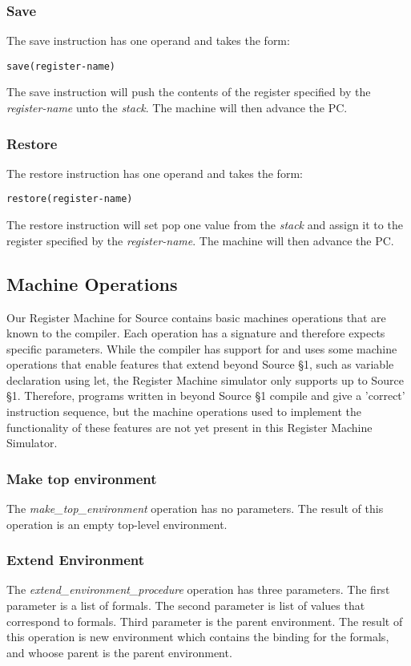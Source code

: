 \subsubsection{Save}
The save instruction has one operand and takes the form:
\begin{lstlisting}
save(register-name)
\end{lstlisting}
The save instruction will push the contents of the register specified by the \textit{register-name} unto the \textit{stack}. The machine will then advance the PC.

\subsubsection{Restore}
The restore instruction has one operand and takes the form:
\begin{lstlisting}
restore(register-name)
\end{lstlisting}
The restore instruction will set pop one value from the \textit{stack} and assign it to the register specified by the \textit{register-name}. The machine will then advance the PC.

\subsection{Machine Operations}
Our Register Machine for Source contains basic machines operations that are known to the compiler. Each operation has a signature and therefore expects specific parameters. While the compiler has support for and uses some machine operations that enable features that extend beyond Source \S 1, such as variable declaration using let, the Register Machine simulator only supports up to Source \S 1. Therefore, programs written in beyond Source \S 1 compile and give a 'correct' instruction sequence, but the machine operations used to implement the functionality of these features are not yet present in this Register Machine Simulator.

\subsubsection{Make top environment}
The\textit{ make\_top\_environment} operation has no parameters.
The result of this operation is an empty top-level environment.

\subsubsection{Extend Environment}
The \textit{ extend\_environment\_procedure} operation has three parameters.
The first parameter is a list of formals. The second parameter is list of values that correspond to formals. Third parameter is the parent environment.
The result of this operation is new environment which contains the binding for the formals, and whoose parent is the parent environment.

